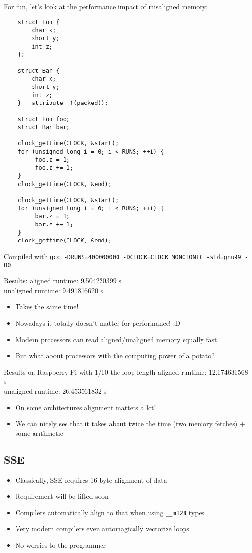 \documentclass[a4paper,12pt]{scrartcl}
\begin{document}
For fun, let's look at the performance impact of misaligned memory:
\begin{verbatim}
    struct Foo {
        char x;
        short y;
        int z;
    };

    struct Bar {
        char x;
        short y;
        int z;
    } __attribute__((packed));

    struct Foo foo;
    struct Bar bar;

    clock_gettime(CLOCK, &start);
    for (unsigned long i = 0; i < RUNS; ++i) {
         foo.z = 1;
         foo.z += 1;
    }
    clock_gettime(CLOCK, &end);

    clock_gettime(CLOCK, &start);
    for (unsigned long i = 0; i < RUNS; ++i) {
         bar.z = 1;
         bar.z += 1;
    }
    clock_gettime(CLOCK, &end);
\end{verbatim}
Compiled with \verb|gcc -DRUNS=400000000 -DCLOCK=CLOCK_MONOTONIC -std=gnu99 -O0|

Results:
aligned runtime: 9.504220399 s\\
unaligned runtime: 9.491816620 s

\begin{itemize}
    \item Takes the same time!
    \item Nowadays it totally doesn't matter for performance! :D
    \item Modern processors can read aligned/unaligned memory equally fast
    \item But what about processors with the computing power of a potato?
\end{itemize}

Results on Raspberry Pi with 1/10 the loop length
aligned runtime: 12.174631568 s\\
unaligned runtime: 26.453561832 s
\begin{itemize}
    \item On some architectures alignment matters a lot!
    \item We can nicely see that it takes about twice the time (two memory fetches) + some
        arithmetic
\end{itemize}

\subsection{SSE}
\begin{itemize}
    \item Classically, SSE requires 16 byte alignment of data
    \item Requirement will be lifted soon
    \item Compilers automatically align to that when using \verb|__m128| types
    \item Very modern compilers even automagically vectorize loops
    \item No worries to the programmer
\end{itemize}
\end{document}
